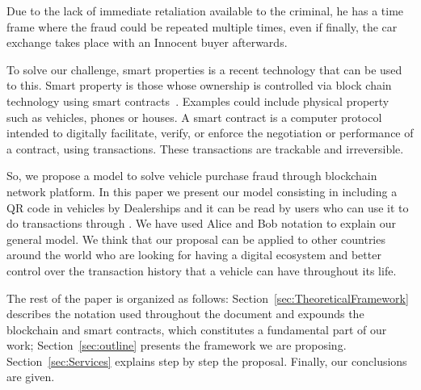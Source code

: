 Due to the lack of immediate retaliation available to the criminal, he has a time frame where the fraud could be repeated multiple times, even if finally, the car exchange takes place with an Innocent buyer afterwards.

To solve our challenge, smart properties  is a recent technology that can be used to this. Smart property is those whose ownership is controlled via block chain technology using smart contracts~\cite{Tapscott2016}. Examples could include physical property such as vehicles, phones or houses. A smart contract is a computer protocol intended to digitally facilitate, verify, or enforce the negotiation or performance of a contract, using transactions. These transactions are trackable and irreversible. 

So, we propose a model to solve vehicle purchase fraud through blockchain network platform. In this paper we present our model consisting in including a QR code in vehicles by Dealerships and it can be read by users who can use it to do transactions through \blockchaincarnetwork. 
We have used Alice and Bob notation to explain our general model. We think that our proposal can be applied to other countries around the world who are looking for having a digital ecosystem and better
control over the transaction history that a vehicle can have throughout its life.

The rest of the paper is organized as follows: 
Section~\ref{sec:TheoreticalFramework} describes the notation used 
throughout the document and expounds the blockchain and smart contracts, 
which constitutes a fundamental part of our work; 
Section~\ref{sec:outline} presents the framework we are proposing. 
Section~\ref{sec:Services} explains step by step the proposal.
Finally, our conclusions are given.